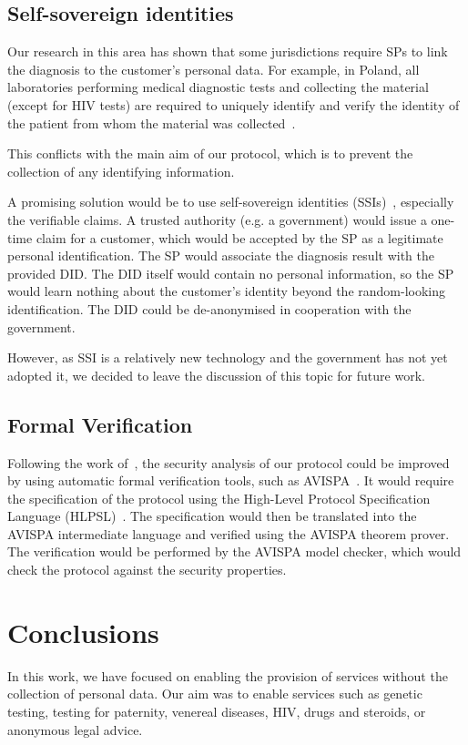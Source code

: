 \documentclass[pdftex,twocolumn,epjc3]{svjour3}
\begin{document}
{\subsection{Self-sovereign identities}
Our research in this area has shown that some jurisdictions require SPs to link the diagnosis to the customer's personal data. For example, in Poland, all laboratories performing medical diagnostic tests and collecting the material (except for HIV tests) are required to uniquely identify and verify the identity of the patient from whom the material was collected~\cite{ministerstwozdrowiaRegulationMinisterHealth2006}.

This conflicts with the main aim of our protocol, which is to prevent the collection of any identifying information.

A promising solution would be to use self-sovereign identities (SSIs)~\cite{muhleSurveyEssentialComponents2018}, especially the verifiable claims. A trusted authority (e.g. a government) would issue a one-time claim for a customer, which would be accepted by the SP as a legitimate personal identification. The SP would associate the diagnosis result with the provided DID. The DID itself would contain no personal information, so the SP would learn nothing about the customer's identity beyond the random-looking identification. The DID could be de-anonymised in cooperation with the government.

However, as SSI is a relatively new technology and the government has not yet adopted it, we decided to leave the discussion of this topic for future work.

\subsection{Formal Verification}\label{sec:formal-verification}
Following the work of~\cite{birjoveanuFormalVerificationMultiparty2022}, the security analysis of our protocol could be improved by using automatic formal verification tools, such as AVISPA~\cite{armandoAVISPAToolAutomated2005}. It would require the specification of the protocol using the High-Level Protocol Specification Language (HLPSL)~\cite{chevalierHighLevelProtocol2004}. The specification would then be translated into the AVISPA intermediate language and verified using the AVISPA theorem prover. The verification would be performed by the AVISPA model checker, which would check the protocol against the security properties.

\section{Conclusions}\label{sec:conclusion}
In this work, we have focused on enabling the provision of services without the collection of personal data. Our aim was to enable services such as genetic testing, testing for paternity, venereal diseases, HIV, drugs and steroids, or anonymous legal advice.

}
\end{document}
